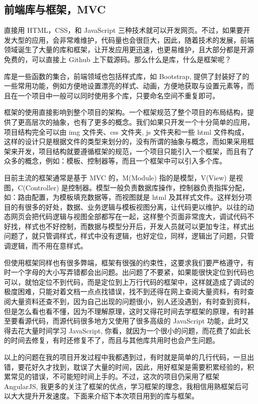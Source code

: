 \documentclass[UTF8]{ctexbook}
\begin{document}
{{        \subsection{前端库与框架，MVC}
          \label{subsec:前端库与框架}
            直接用 HTML，CSS，和 JavaScript 三种技术就可以开发网页。不过，如果要开发大型的应用，会非常难维护，代码量也会很巨大，因此，随着技术的发展，前端领域诞生了大量的库和框架，让开发应用更迅速，也更易维护，且大部分都是开源免费的，可以直接上 Github 上下载源码。那么什么是库，什么是框架呢？
            \par
            库是一些函数的集合，前端领域也包括样式库，如 Bootstrap, 提供了封装好了的一些常用功能，例如方便地设置漂亮的样式、动画，方便地获取与设置元素等，而且在一个项目中一般可以同时使用多个库，只要命名空间不重复即可。
            \par
            框架的使用直接影响到整个项目的架构。一个框架规范了整个项目的布局结构，提供了更高层次的抽象，也有了更多的概念。我们如果只开发一个十分简单的应用，项目结构完全可以由 img 文件夹、css 文件夹, js 文件夹和一些 html 文件构成，这样的设计只是根据文件的类型来划分的，没有所谓的抽象与概念，而如果采用框架来开发，项目结构就要遵循框架的规范，一个项目只能引入一个框架，而且有了众多的概念，例如：模板、控制器等，而且一个框架中可以引入多个库。
            \par
            目前主流的框架通常是基于 MVC 的，M(Module) 指的是模型，V(View) 是视图，C(Controller) 是控制器。模型一般负责数据库操作，控制器负责指挥分配，如：路由配置，为模板填充数据等，而视图就是 html 及其样式文件。这样划分项目的有很多的好处，数据、业务逻辑与模板视图分离，让代码更以维护。以往的动态网页会把代码逻辑与视图全部都写在一起，这样整个页面非常庞大，调试代码不好找，样式也不好控制，而数据与模型分开后，开发人员就可以更加专注，样式出问题了，就只管调样式，样式中没有逻辑，也好定位，同样，逻辑出了问题，只管调逻辑，而不用在意样式。
            \par
            但使用框架同样也有很多弊端，框架有很强的约束性，这要求我们要严格遵守，有时一个字母的大小写弄错都会出问题。出问题了不要紧，如果能很快定位到代码也可以，就怕定位不到代码，而是定位到上万行代码的框架中，这样就造成了调试的极度困难，只能对着文档一点点找错误，找不到还得在网上查阅大量资料，有时查阅大量资料还查不到，因为自己出现的问题很小，别人还没遇到，有时查到资料，但是怎么看也看不懂，因为不理解原理，这时又得花时间去学框架的原理，有时甚至要看源代码，而源代码很多地方又使用了很多高级的 JavaScript 功能，此时又得去花大量时间学习 JavaScript, 你看，就因为一个很小的问题，而花费了如此长的时间去修复，有时还修复不了，而且与其他库共用时也会产生问题。
            \par
            以上的问题在我的项目开发过程中我都遇到过，有时就是简单的几行代码，一旦出错，要花好久才找到，耽误了大量的时间，因此，用好框架是需要积累经验的，积累常见的错误，不可能短时间上手的。不过，这次的项目仍采用了框架 AngularJS, 我更多的关注了框架的优点，学习框架的理念，我相信用熟框架后可以大大提升开发速度。下面来介绍下本次项目用到的库与框架。

}}
\end{document}
